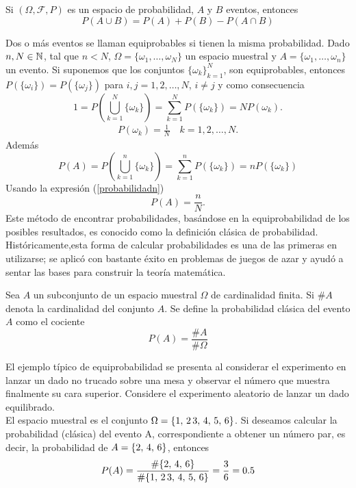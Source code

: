\begin{Cor}
    Si $(\Omega,\mathscr{F},P)$ es un espacio de probabilidad, $A$ y $B$ eventos, entonces
    $$P(A\cup B)=P(A)+P(B)-P(A\cap B)$$
\end{Cor}
Dos o más eventos se llaman equiprobables si tienen la misma probabilidad.
Dado $n,N\in{\mathbb{N}}$, tal que $n<N$, $\Omega=\{\omega_1,\ldots,\omega_N\}$ un espacio muestral y $A=\{\omega_1,\ldots,\omega_n\}$ un evento.
Si suponemos que los conjuntos  $\{\omega_k\}_{k=1}^N$, son equiprobables, entonces $P(\{\omega_i\})=P(\{\omega_j\})$ para $i,j=1,2,\ldots,N$, $i\not=j$ y como consecuencia $$1=P(\bigcup_{k=1}^N \{\omega_k\})=\sum_{k=1}^N P(\{\omega_k\})=N P(\omega_k).$$
\begin{eqnarray}
    \label{probabilidadn}
    P(\omega_k)=\frac{1}{N}\quad k=1,2,\ldots ,N.
\end{eqnarray}
Además
$$P(A)=P(\bigcup_{k=1}^n \{\omega_k\})=\sum_{k=1}^n P(\{\omega_k\})=n P(\{\omega_k\})$$
Usando la expresión (\ref{probabilidadn})
$$P(A)=\frac{n}{N}.$$
Este método de encontrar probabilidades, basándose en la equiprobabilidad de los posibles resultados, es conocido como la definición clásica de probabilidad.\\
Históricamente,esta forma de calcular probabilidades es una de las primeras en utilizarse; se aplicó con bastante éxito en problemas de juegos de azar y ayudó a sentar las bases para construir la teoría matemática.
\begin{Def}
    Sea $A$ un subconjunto de un espacio muestral $\Omega$ de cardinalidad finita. Si $\#A$ denota la cardinalidad del conjunto $A$. Se define la probabilidad clásica del evento $A$ como el cociente $$P(A)=\frac{\#A}{\#\Omega}$$
    \label{defprobClásica}
\end{Def}
\begin{Ejm}
    El ejemplo típico de equiprobabilidad se presenta al considerar el experimento  en lanzar un dado no trucado sobre una mesa y observar el número que muestra finalmente su cara superior. Considere el experimento aleatorio de lanzar un dado equilibrado.\\ El espacio muestral es el conjunto  $\Omega=\{1,\thinspace 2\thinspace 3,\thinspace 4,\thinspace 5,\thinspace 6\}$. Si deseamos calcular la probabilidad (clásica) del evento A, correspondiente a obtener un número par, es decir, la probabilidad de $A=\{2,\thinspace 4,\thinspace 6\}$, entonces $$P(A)=\frac{\#\{2,\thinspace 4,\thinspace 6\}}{\#\{1,\thinspace 2\thinspace 3,\thinspace 4,\thinspace 5,\thinspace 6\}}=\frac{3}{6}=0.5$$
\end{Ejm}
